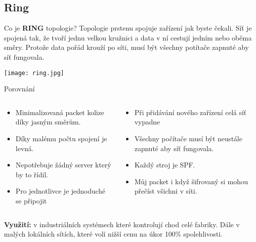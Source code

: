 \documentclass{beamer}
\begin{document}
\subsection{Ring}
\label{sec:ring}

\begin{frame}{Co je \textbf{RING} topologie?}
 Topologie prstenu spojuje zařízení jak byste čekali. Síť je spojená tak, že
 tvoří jednu velkou kružnici a data v ní cestují jedním nebo oběma směry. Protože
 data pořád krouží po síti, musí být všechny potítače zapnuté aby síť fungovala.

 \texttt{[image: ring.jpg]}
 
\end{frame}

\begin{frame}{Porovnání}

\begin{columns}
    \begin{column}{0.45\textwidth}
        \begin{itemize}
            \item Minimalizovaná packet kolize díky jasným směrům.
            \item Díky malému počtu spojení je levná.
            \item Nepotřebuje žádný server který by to řídil.
            \item Pro jednotlivce je jednoduché se připojit
        \end{itemize}
    \end{column}
    \begin{column}{0.45\textwidth}  %
        \begin{itemize}
            \item Při přidávání nového zařízení celá síť vypadne
            \item Všechny počítače musí být neustále zapnuté aby síť fungovala.
            \item Každý stroj je SPF.
            \item Můj packet i když šifrovaný si mohou přečíst všichni v síti.
        \end{itemize}
    \end{column}
    \end{columns}
    \vspace{10pt}

\textbf{Využití:} v industriálních systémech které kontrolují chod celé fabriky.
Dále v malých lokálních sítích, které volí nižší cenu na úkor 100\% spolehlivosti.

\end{frame}
\end{document}
